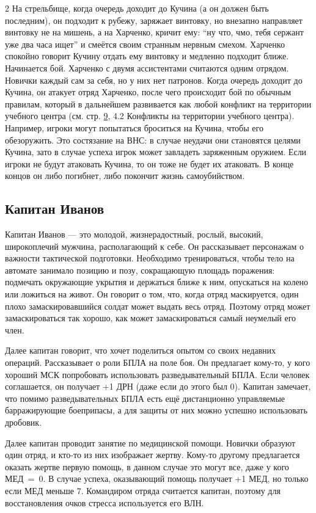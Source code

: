 \documentclass[twoside]{article}
\begin{document}
\begin{multicols}{2}
На стрельбище, когда очередь доходит до Кучина (а он должен быть
последним), он подходит к рубежу, заряжает винтовку, но внезапно
направляет винтовку не на мишень, а на Харченко, кричит ему: \enquote{ну что,
чмо, тебя сержант уже два часа ищет} и смеётся своим странным нервным
смехом. Харченко спокойно говорит Кучину отдать ему винтовку и медленно
подходит ближе. Начинается бой. Харченко с двумя ассистентами считаются
одним отрядом. Новички каждый сам за себя, но у них нет патронов. Когда
очередь доходит до Кучина, он атакует отряд Харченко, после чего
происходит бой по обычным правилам, который в дальнейшем развивается как
любой конфликт на территории учебного центра (см. стр.
\hyperref[training-conflicts]{9},
4.2 Конфликты на территории учебного центра). Например, игроки могут
попытаться броситься на Кучина, чтобы его обезоружить. Это состязание на
ВНС: в случае неудачи они становятся целями Кучина, зато в случае успеха
игрок может завладеть заряженным оружием. Если игроки не будут атаковать
Кучина, то он тоже не будет их атаковать. В конце концов он либо
погибнет, либо покончит жизнь самоубийством.

\subsection{Капитан Иванов}\label{captain-ivanov}

Капитан Иванов --- это молодой, жизнерадостный, рослый, высокий,
широкоплечий мужчина, располагающий к себе. Он рассказывает персонажам о
важности тактической подготовки. Необходимо тренироваться, чтобы тело на
автомате занимало позицию и позу, сокращающую площадь поражения:
подмечать окружающие укрытия и держаться ближе к ним, опускаться на
колено или ложиться на живот. Он говорит о том, что, когда отряд
маскируется, один плохо замаскировавшийся солдат может выдать весь
отряд. Поэтому отряд может замаскироваться так хорошо, как может
замаскироваться самый неумелый его член.

Далее капитан говорит, что хочет поделиться опытом со своих недавних
операций. Рассказывает о роли БПЛА на поле боя. Он предлагает кому-то, у
кого хороший МСК попробовать использовать разведывательный БПЛА. Если
человек соглашается, он получает +1 ДРН (даже если до этого был
0). Капитан замечает, что помимо разведывательных БПЛА есть ещё
дистанционно управляемые барражирующие боеприпасы, а для защиты от них
можно успешно использовать дробовик.

Далее капитан проводит занятие по медицинской помощи. Новички образуют
один отряд, и кто-то из них изображает жертву. Кому-то другому
предлагается оказать жертве первую помощь, в данном случае это могут
все, даже у кого МЕД~=~0. В случае успеха, оказывающий помощь получает
+1 МЕД, но только если МЕД меньше 7. Командиром отряда считается
капитан, поэтому для восстановления очков стресса используется его ВЛН.


\end{multicols}
\end{document}
